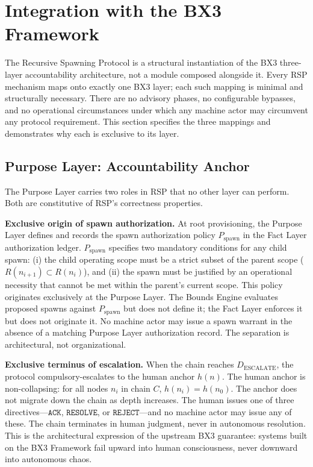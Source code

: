 \section{Integration with the BX3 Framework}
\label{sec:rs-integration}

The Recursive Spawning Protocol is a structural instantiation of the BX3 three-layer accountability architecture, not a module composed alongside it. Every RSP mechanism maps onto exactly one BX3 layer; each such mapping is minimal and structurally necessary. There are no advisory phases, no configurable bypasses, and no operational circumstances under which any machine actor may circumvent any protocol requirement. This section specifies the three mappings and demonstrates why each is exclusive to its layer.

\subsection{Purpose Layer: Accountability Anchor}
\label{sec:rs-purpose-anchor}

The Purpose Layer carries two roles in RSP that no other layer can perform. Both are constitutive of RSP's correctness properties.

\medskip
\noindent\textbf{Exclusive origin of spawn authorization.} At root provisioning, the Purpose Layer defines and records the spawn authorization policy $P_{\mathrm{spawn}}$ in the Fact Layer authorization ledger. $P_{\mathrm{spawn}}$ specifies two mandatory conditions for any child spawn: (i) the child operating scope must be a strict subset of the parent scope ($R(n_{i+1}) \subset R(n_i)$), and (ii) the spawn must be justified by an operational necessity that cannot be met within the parent's current scope. This policy originates exclusively at the Purpose Layer. The Bounds Engine evaluates proposed spawns against $P_{\mathrm{spawn}}$ but does not define it; the Fact Layer enforces it but does not originate it. No machine actor may issue a spawn warrant in the absence of a matching Purpose Layer authorization record. The separation is architectural, not organizational.

\medskip
\noindent\textbf{Exclusive terminus of escalation.} When the chain reaches $D_{\mathrm{ESCALATE}}$, the protocol compulsory-escalates to the human anchor $h(n)$. The human anchor is non-collapsing: for all nodes $n_i$ in chain $C$, $h(n_i) = h(n_0)$. The anchor does not migrate down the chain as depth increases. The human issues one of three directives---$\texttt{ACK}$, $\texttt{RESOLVE}$, or $\texttt{REJECT}$---and no machine actor may issue any of these. The chain terminates in human judgment, never in autonomous resolution. This is the architectural expression of the upstream BX3 guarantee: systems built on the BX3 Framework fail upward into human consciousness, never downward into autonomous chaos.

